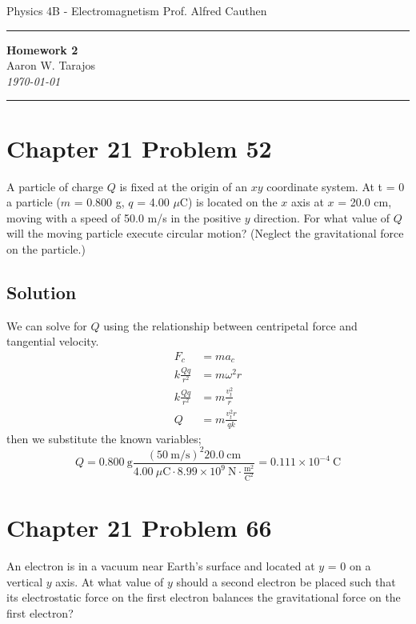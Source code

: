 \documentclass{article}
\newcommand{\g}{\text{g}}
\newcommand{\m}{\text{m}}
\newcommand{\centi}{\text{c}}
\newcommand{\s}{\text{s}}
\newcommand{\N}{\text{N}}
\newcommand{\C}{\text{C}}
\begin{document}
\noindent
Physics 4B - Electromagnetism \hfill Prof. Alfred Cauthen
\noindent\rule{\textwidth}{0.4pt}

\begin{center}
    \textbf{\LARGE Homework 2} \\
    \vspace{12pt}
    \large Aaron W. Tarajos \\
    \textit{\today}
\end{center}

\noindent\rule{\textwidth}{0.4pt}

\section*{Chapter 21 Problem 52}
A particle of charge $Q$ is fixed at the origin of an $xy$ coordinate system. 
At t = 0 a particle ($m$ = 0.800 g, $q$ = 4.00 $\mu$C) is located on the $x$ axis at $x$ = 20.0 cm, moving with a speed of 50.0 m/s in the positive $y$ direction. 
For what value of $Q$ will the moving particle execute circular motion? (Neglect the gravitational force on the particle.)

\subsection*{Solution}
We can solve for $Q$ using the relationship between centripetal force and tangential velocity.
\begin{align*}
	F_c &= m a_c \\
	k \frac{Qq}{r^2} &= m \omega^2 r \\
	k \frac{Qq}{r^2} &= m \frac{v_t^2}{r} \\
	Q &= m \frac{v_t^2 r}{qk}
\end{align*}
then we substitute the known variables;
\[
	Q = 0.800\ \g \frac{\left( 50\ \m / \s \right)^2 20.0\ \centi \m}{4.00\ \mu \C \cdot 8.99 \times 10^9\ \N \cdot \frac{\m^2}{\C^2}} = \boxed{0.111 \times 10^{-4}\ \C}	
\]

\section*{Chapter 21 Problem 66}
An electron is in a vacuum near Earth’s surface and located at $y$ = 0 on a vertical $y$ axis. 
At what value of $y$ should a second electron be placed such that its electrostatic force on the first electron balances the gravitational force on the first electron?
\end{document}
